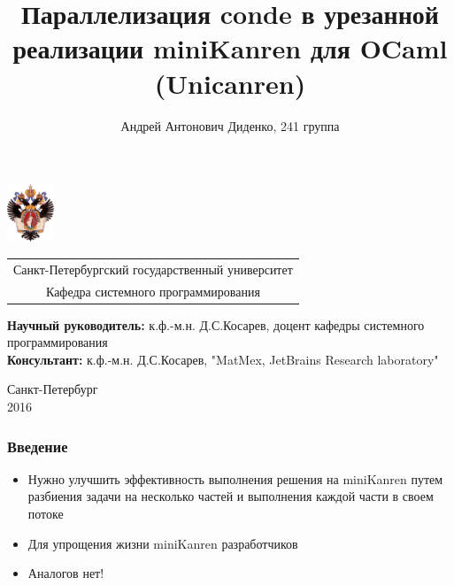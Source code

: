 \documentclass{beamer}
\title[Параллелизация miniKanren]{Параллелизация conde в урезанной реализации miniKanren для OCaml (Unicanren)}
\institute[СПбГУ]{}
\author[Андрей Диденко]{Андрей Антонович Диденко, 241 группа}
\begin{document}
{
\begin{frame}
  \includegraphics[width=1.4cm]{pictures/SPbGU_Logo.png}
  \vspace{-35pt}
  \hspace{-10pt}
  \begin{center}
    \begin{tabular}{c}
      \scriptsize{Санкт-Петербургский государственный университет} \\
      \scriptsize{Кафедра системного программирования}
    \end{tabular}
    \titlepage
  \end{center}

  \btVFill

  {\scriptsize
  {\bfseries Научный руководитель:} к.ф.-м.н. Д.С.Косарев, доцент кафедры системного программирования \\
  {\bfseries Консультант:}  к.ф.-м.н. Д.С.Косарев, "MatMex, JetBrains Research laboratory" \\
  }
  \begin{center}
    \vspace{5pt}
    \scriptsize{Санкт-Петербург\\
      2016}
  \end{center}

\end{frame}
}

\begin{frame}[fragile]
  \frametitle{Введение}
  \begin{itemize}
    \item Нужно улучшить эффективность выполнения решения на miniKanren путем разбиения задачи на несколько частей и выполнения каждой части в своем потоке
    \item Для упрощения жизни miniKanren разработчиков
    \item Аналогов нет!
  \end{itemize}
\end{frame}
\end{document}
